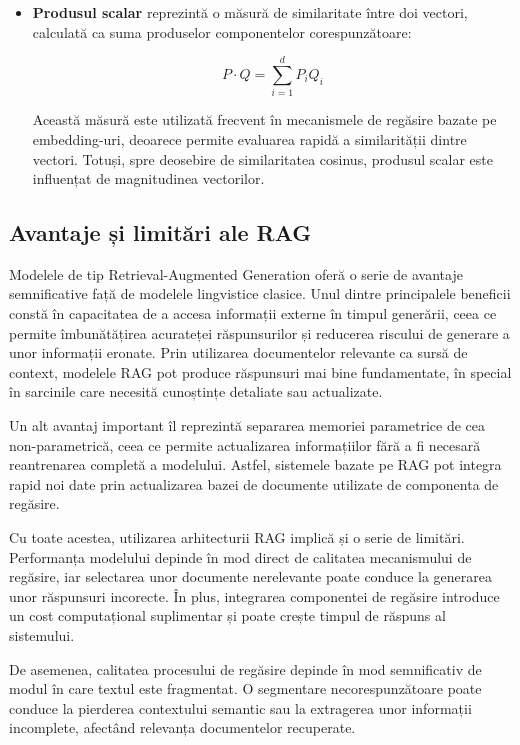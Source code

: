 \documentclass[12pt, a4paper, oneside, romanian]{teza-upb}
\begin{document}
\begin{itemize}
\item\textbf{Produsul scalar} reprezintă o măsură de similaritate între doi vectori, calculată ca suma produselor componentelor corespunzătoare:

\begin{equation}
P \cdot Q = \sum_{i=1}^{d} P_i Q_i
\end{equation}

Această măsură este utilizată frecvent în mecanismele de regăsire bazate pe embedding-uri, deoarece permite evaluarea rapidă a similarității dintre vectori. Totuși, spre deosebire de similaritatea cosinus, produsul scalar este influențat de magnitudinea vectorilor. \cite{levy2024similarity}
\end{itemize}
    \subsection{Avantaje și limitări ale RAG}
  

Modelele de tip Retrieval-Augmented Generation oferă o serie de avantaje semnificative față de modelele lingvistice clasice. Unul dintre principalele beneficii constă în capacitatea de a accesa informații externe în timpul generării, ceea ce permite îmbunătățirea acurateței răspunsurilor și reducerea riscului de generare a unor informații eronate. Prin utilizarea documentelor relevante ca sursă de context, modelele RAG pot produce răspunsuri mai bine fundamentate, în special în sarcinile care necesită cunoștințe detaliate sau actualizate.

Un alt avantaj important îl reprezintă separarea memoriei parametrice de cea non-parametrică, ceea ce permite actualizarea informațiilor fără a fi necesară reantrenarea completă a modelului. Astfel, sistemele bazate pe RAG pot integra rapid noi date prin actualizarea bazei de documente utilizate de componenta de regăsire.\cite{lewis2020retrieval}

Cu toate acestea, utilizarea arhitecturii RAG implică și o serie de limitări. Performanța modelului depinde în mod direct de calitatea mecanismului de regăsire, iar selectarea unor documente nerelevante poate conduce la generarea unor răspunsuri incorecte. În plus, integrarea componentei de regăsire introduce un cost computațional suplimentar și poate crește timpul de răspuns al sistemului. 


De asemenea, calitatea procesului de regăsire depinde în mod semnificativ de modul în care textul este fragmentat. O segmentare necorespunzătoare poate conduce la pierderea contextului semantic sau la extragerea unor informații incomplete, afectând relevanța documentelor recuperate. 
\end{document}
